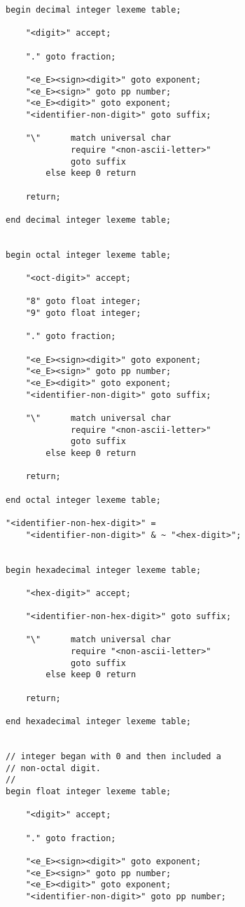\documentclass[12pt]{article}
\newenvironment{indpar}[1][0.3in]%
	{\begin{list}{}%
		     {\setlength{\itemsep}{0in}%
		      \setlength{\topsep}{0in}%
		      \setlength{\parsep}{1ex}%
		      \setlength{\labelwidth}{#1}%
		      \setlength{\leftmargin}{#1}%
		      \addtolength{\leftmargin}{\labelsep}}%
	 \item}%
	{\end{list}}
\begin{document}
\begin{indpar}
\begin{verbatim}
begin decimal integer lexeme table;

    "<digit>" accept;

    "." goto fraction;

    "<e_E><sign><digit>" goto exponent;
    "<e_E><sign>" goto pp number;
    "<e_E><digit>" goto exponent;
    "<identifier-non-digit>" goto suffix;

    "\"      match universal char
             require "<non-ascii-letter>"
             goto suffix
        else keep 0 return

    return;

end decimal integer lexeme table;


begin octal integer lexeme table;

    "<oct-digit>" accept;

    "8" goto float integer;
    "9" goto float integer;

    "." goto fraction;

    "<e_E><sign><digit>" goto exponent;
    "<e_E><sign>" goto pp number;
    "<e_E><digit>" goto exponent;
    "<identifier-non-digit>" goto suffix;

    "\"      match universal char
             require "<non-ascii-letter>"
             goto suffix
        else keep 0 return

    return;

end octal integer lexeme table;

"<identifier-non-hex-digit>" =
    "<identifier-non-digit>" & ~ "<hex-digit>";


begin hexadecimal integer lexeme table;

    "<hex-digit>" accept;

    "<identifier-non-hex-digit>" goto suffix;

    "\"      match universal char
             require "<non-ascii-letter>"
             goto suffix
        else keep 0 return

    return;

end hexadecimal integer lexeme table;


// integer began with 0 and then included a
// non-octal digit.
//
begin float integer lexeme table;

    "<digit>" accept;

    "." goto fraction;

    "<e_E><sign><digit>" goto exponent;
    "<e_E><sign>" goto pp number;
    "<e_E><digit>" goto exponent;
    "<identifier-non-digit>" goto pp number;


\end{verbatim}
\end{indpar}
\end{document}
